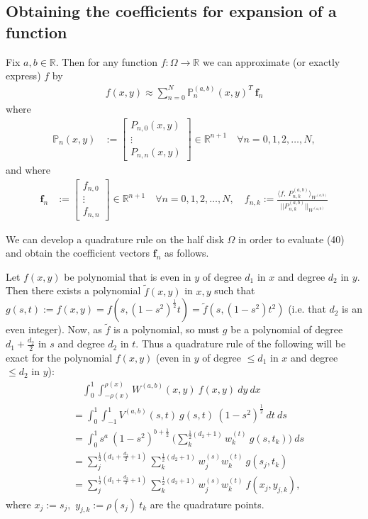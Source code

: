 \documentclass[11pt, oneside]{article}   	%
\newcommand{\sotodo}{\todo[color=green]}
\newcommand{\half}{\frac{1}{2}}
\newcommand{\R}{\mathbb{R}}
\newcommand{\bigP}{\mathbb{P}}
\newcommand{\Pnk}{P_{n,k}}
\begin{document}
\subsection{Obtaining the coefficients for expansion of a function}

Fix \(a,b \in \R\). Then for any function \(f : \Omega \to \R\) we can approximate (or exactly express) \(f\) by
\begin{align*}
f(x,y) \approx \sum_{n=0}^N \bigP_n^{(a,b)}(x,y)^T \: \mathbf{f}_n
\end{align*}
where
\begin{align*}
\bigP_n(x,y) &:= \begin{bmatrix}
		P_{n,0}(x,y) \\
		\vdots \\
		P_{n,n}(x,y)
	\end{bmatrix} \in \R^{n+1} \quad \forall n = 0,1,2,\dots,N,
\end{align*}
and where
\begin{align*}
\mathbf{f}_n &:= \begin{bmatrix}
		f_{n,0} \\
		\vdots \\
		f_{n,n}
	\end{bmatrix} \in \R^{n+1} \quad \forall n = 0,1,2,\dots,N, \quad
f_{n,k} := \frac{\langle f, \: \Pnk^{(a,b)} \rangle_{W^{(a,b)}}}{|| \Pnk^{(a,b)} ||_{W^{(a,b)}}}
\end{align*}




We can develop a quadrature rule on the half disk \(\Omega\) in order to evaluate (40) and obtain the coefficient vectors \(\mathbf{f}_n\) as follows.




Let \(f(x,y)\) be polynomial that is even in \(y\) of degree $d_1$ in $x$ and degree $d_2$ in $y$\sotodo{Clarify this}. Then there exists a polynomial \(\tilde{f}(x,y)\) in \(x,y\) such that \(g(s,t) := f(x, y) = f(s, (1-s^2)^\half t) = \tilde{f}(s, (1-s^2) t^2)\) (i.e. that $d_2$ is an even integer). Now, as \(\tilde{f}\) is a polynomial, so must \(g\) be a polynomial of degree $d_1+\frac{d_2}{2}$ in $s$ and degree $d_2$ in $t$. Thus a quadrature rule of the following will be exact for the polynomial $f(x,y)$ (even in \(y\) of degree $\le d_1$ in $x$ and degree $\le d_2$ in $y$):
\begin{align}
& \quad \int_0^1 \int_{-\rho(x)}^{\rho(x)} W^{(a,b)}(x,y) \: f(x,y) \: dy \: dx \\
&= \int_0^1 \int_{-1}^1 V^{(a,b)}(s,t) \: g(s,t) \: (1-s^2)^\half \: dt \: ds \\
&= \int_0^1 s^a \: (1-s^2)^{b+\half} \: \Big( \sum_k^{\half(d_2 + 1)} w_k^{(t)} \: g(s, t_k) \Big) \: ds \\
&= \sum_j^{\half(d_1 + \frac{d_2}{2} + 1)} \sum_k^{\half(d_2 + 1)} w_j^{(s)} w_k^{(t)} \: g(s_j, t_k) \\
&= \sum_j^{\half(d_1 + \frac{d_2}{2} + 1)} \sum_k^{\half(d_2 + 1)} w_j^{(s)} w_k^{(t)} \: f(x_j, y_{j,k}),
\end{align}
where \(x_j := s_j,\) \(y_{j,k} := \rho(s_j) \: t_k\) are the quadrature points.
\end{document}
